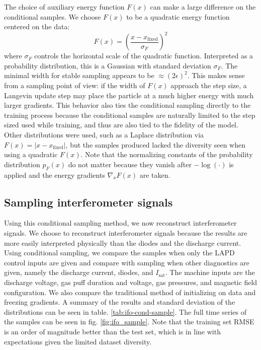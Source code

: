 The choice of auxiliary energy function $F(x)$ can make a large difference on the conditional samples. We choose $F(x)$ to be a quadratic energy function centered on the data: 
\begin{equation}
	F(x) = \left(\frac{x - x_\text{fixed}}{\sigma_F} \right)^2
\end{equation}
where $\sigma_F$ controls the horizontal scale of the quadratic function. Interpreted as a probability distribution, this is a Gaussian with standard deviation $\sigma_F$. The minimal width for stable sampling appears to be $\approx (2 \epsilon)^2$. This makes sense from a sampling point of view: if the width of $F(x)$ approach the step size, a Langevin update step may place the particle at a much higher energy with much larger gradients. This behavior also ties the conditional sampling directly to the training process because the conditional samples are naturally limited to the step sized used while training, and thus are also tied to the fidelity of the model. Other distributions were used, such as a Laplace distribution via $F(x) = \vert x - x_\text{fixed} \vert$, but the samples produced lacked the diversity seen when using a quadratic $F(x)$. Note that the normalizing constants of the probability distribution $p_F(x)$ do not matter because they vanish after $-\log(\cdot)$ is applied and the energy gradients $\nabla_x F(x)$ are taken.

\subsection{Sampling interferometer signals}

Using this conditional sampling method, we now reconstruct interferometer signals. We choose to reconstruct interferometer signals because the results are more easily interpreted physically than the diodes and the discharge current. Using conditional sampling, we compare the samples when only the LAPD control inputs are given and compare with sampling when other diagnostics are given, namely the discharge current, diodes, and $I_\text{sat}$. The machine inputs are the discharge voltage, gas puff duration and voltage, gas pressures, and magnetic field configuration. We also compare the traditional method of initializing on data and freezing gradients. A summary of the results and standard deviation of the distributions can be seen in table. \ref{tab:ifo-cond-sample}. The full time series of the samples can be seen in fig. \ref{fig:ifo_sample}. Note that the training set RMSE is an order of magnitude better than the test set, which is in line with expectations given the limited dataset diversity.


